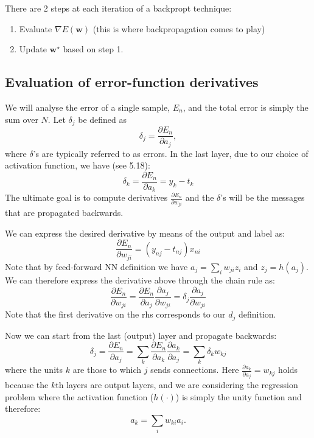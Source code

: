 \documentclass[a4paper]{article}
\newcommand{\mb}{\mathbf}
\begin{document}
There are 2 steps at each iteration of a backpropt technique:
\begin{enumerate}
\setlength{\parindent}{0mm}
\item Evaluate $\nabla E(\mb{w})$ (this is where backpropagation comes to play)
\setlength{\parindent}{0mm}
\item Update $\mb{w}^{\star}$ based on step 1.
\setlength{\parindent}{0mm}
\end{enumerate}

\subsection{Evaluation of error-function derivatives}
We will analyse the error of a single sample, $E_n$, and the total error is simply the sum over $N$. Let $\delta_j$ be defined as
\begin{equation}
\delta_j=\frac{\partial E_n}{\partial a_j},
\end{equation}
where $\delta$'s are typically referred to as errors. In the last layer, due to our choice of activation function, we have (see 5.18):
%
\begin{equation}
\delta_k = \frac{\partial E_n}{\partial a_k} = y_k-t_k
\end{equation}
%
The ultimate goal is to compute derivatives $\frac{\partial E_n}{\partial w_{ji}}$ and the $\delta$'s will be the messages that are propagated backwards.

We can express the desired derivative by means of the output and label as:
%
\begin{equation}
\frac{\partial E_n}{\partial w_{ji}} = (y_{nj}-t_{nj})x_{ni}
\end{equation}
%
Note that by feed-forward NN definition we have $a_j=\sum\limits_i w_{ji}z_i$ and $z_j=h(a_j)$. We can therefore express the derivative above through the chain rule as:
%
\begin{equation}
\frac{\partial E_n}{\partial w_{ji}} = \frac{\partial E_n}{\partial a_j}\frac{\partial a_j}{\partial w_{ji}}=\delta_j \frac{\partial a_j}{\partial w_{ji}}
\end{equation}
%
%
Note that the first derivative on the rhs corresponds to our $d_j$ definition.

Now we can start from the last (output) layer and propagate backwards:
\begin{equation}
\delta_j=\frac{\partial E_n}{\partial a_j}=\sum\limits_k \frac{\partial E_n}{\partial a_k}\frac{\partial a_k}{\partial a_j}=\sum\limits_k\delta_k w_{kj}
\label{eq:bp_output}
\end{equation}
where the units $k$ are those to which $j$ sends connections. Here $\frac{\partial a_k}{\partial a_j}=w_{kj}$ holds because the $k$th layers are output layers, and we are considering the regression problem where the activation function ($h(\cdot)$) is simply the unity function and therefore:
%
\begin{equation}
a_k=\sum\limits_i w_{ki}a_{i}.
\end{equation}
%
\end{document}
